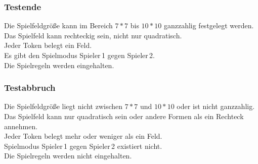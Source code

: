 \documentclass[a4paper, 12pt]{article}
\begin{document}
	\subsubsection{Testende}
	Die Spielfeldgröße kann im Bereich $7*7$ bis $10*10$ ganzzahlig festgelegt werden.\\
	Das Spielfeld kann rechteckig sein, nicht nur quadratisch.\\
	Jeder Token belegt ein Feld.\\
	Es gibt den Spielmodus Spieler\,1 gegen Spieler\,2.\\
	Die Spielregeln werden eingehalten.\\
	
	\subsubsection{Testabbruch}
	Die Spielfeldgröße liegt nicht zwischen $7*7$ und $10*10$ oder ist nicht ganzzahlig.\\
	Das Spielfeld kann nur quadratisch sein oder andere Formen als ein Rechteck annehmen.\\
	Jeder Token belegt mehr oder weniger als ein Feld.\\
	Spielmodus Spieler\,1 gegen Spieler\,2 existiert nicht.\\
	Die Spielregeln werden nicht eingehalten.\\		
	
\end{document}
